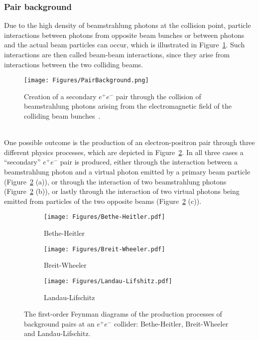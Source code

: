 \subsubsection{Pair background}
\label{BeamBeam:pairs}
Due to the high density of beamstrahlung photons at the collision point, particle interactions between photons from opposite beam bunches or between photons and the actual beam particles can occur, which is illustrated in Figure~\ref{fig:Pair_production}.
Such interactions are then called beam-beam interactions, since they arise from interactions between the two colliding beams.
\begin{figure}
\centering
\texttt{[image: Figures/PairBackground.png]}
\caption{Creation of a secondary $e^+e^-$ pair through the collision of beamstrahlung photons arising from the electromagnetic field of the colliding beam bunches~\cite[p. 29]{Vogel}.}
\label{fig:Pair_production} 
\end{figure}
\\One possible outcome is the production of an electron-positron pair through three different physics processes, which are depicted in Figure~\ref{fig:Feynman:pair_production}.
In all three cases a ``secondary'' $e^+e^-$ pair is produced, either through the interaction between a beamstrahlung photon and a virtual photon emitted by a primary beam particle (Figure~\ref{fig:Feynman:pair_production} (a)),
or through the interaction of two beamstrahlung photons (Figure~\ref{fig:Feynman:pair_production} (b)),
or lastly through the interaction of two virtual photons being emitted from particles of the two opposite beams (Figure~\ref{fig:Feynman:pair_production} (c)).
\begin{figure}[h]
\begin{subfigure}[b]{0.33\textwidth}
\texttt{[image: Figures/Bethe-Heitler.pdf]}
\caption{Bethe-Heitler}
\end{subfigure}
\begin{subfigure}[b]{0.33\textwidth}
\texttt{[image: Figures/Breit-Wheeler.pdf]}
\caption{Breit-Wheeler}
\end{subfigure}
\begin{subfigure}[b]{0.33\textwidth}
\texttt{[image: Figures/Landau-Lifshitz.pdf]}
\caption{Landau-Lifschitz}
\end{subfigure}
\caption[Feynman diagrams of the production of the background pairs.]{The first-order Feynman diagrams of the production processes of background pairs at an $e^+e^-$ collider: Bethe-Heitler, Breit-Wheeler and Landau-Lifschitz.}
\label{fig:Feynman:pair_production}
\end{figure}

